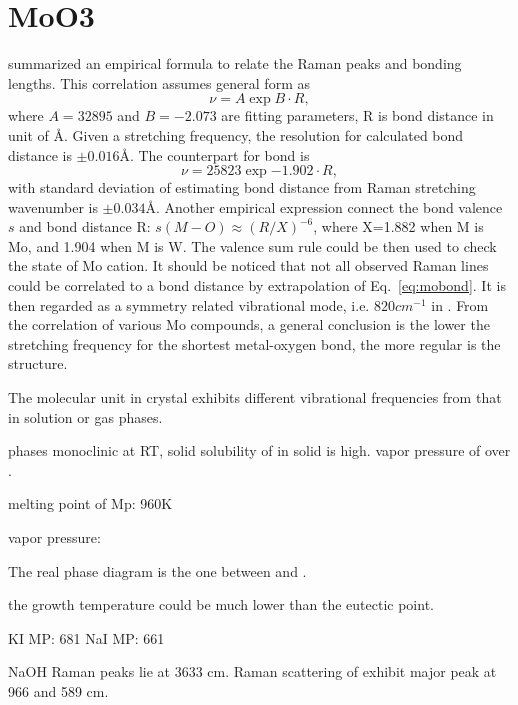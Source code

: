 \section{MoO3}

\citeauthor{Hardcastle1990} summarized an empirical formula to relate the Raman peaks and  bonding lengths.\cite{Hardcastle1990} This correlation assumes general form as
\begin{equation}\label{eq:mobond}
\nu = A \exp{B\cdot R},
\end{equation}
where $A=32895$ and $B=-2.073$ are fitting parameters, R is bond distance in unit of \AA. Given a stretching frequency, the resolution for calculated bond distance is $\pm0.016$\AA. The counterpart for  bond \cite{Hardcastle1995} is
\begin{equation}\label{eq:wobond}
\nu = 25823 \exp{-1.902\cdot R},
\end{equation}
with standard deviation of estimating  bond distance from Raman stretching wavenumber is $\pm0.034$\AA. Another empirical expression connect the bond valence $s$ and bond distance R: $s(M-O) \approx (R/X)^{-6} $, where X=1.882 when M is Mo, and 1.904 when M is W. The valence sum rule could be then used to check the state of Mo cation. It should be noticed that not all observed Raman lines could be correlated to a  bond distance by extrapolation of Eq.~\ref{eq:mobond}. It is then regarded as a symmetry related vibrational mode, i.e. $820 cm^{-1}$ in . From the correlation of various Mo compounds, a general conclusion is the lower the stretching frequency for the shortest metal-oxygen bond, the more regular is the structure.



The molecular unit in crystal exhibits different vibrational frequencies from that in solution or gas phases.

 phases monoclinic at RT, solid solubility of  in solid  is high. vapor pressure of  over .

melting point of 
Mp:  960K

 vapor pressure:

The real phase diagram is the one between  and .

the growth temperature could be much lower than the eutectic point.

KI MP:  681
NaI MP: 661

NaOH Raman peaks lie at 3633 cm. \cite{walrafen2006} Raman scattering of  exhibit major peak at 966 and 589 cm.\cite{Richet1996}

